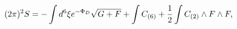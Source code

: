 \begin{equation}
(2\pi)^2 S=-\int d^{6}\xi e^{-\Phi_{D}}\sqrt{G+F} + \int C_{(6)} +{1\over2} \int C_{(2)}\wedge F\wedge F ,
\label{azione}
\end{equation}

